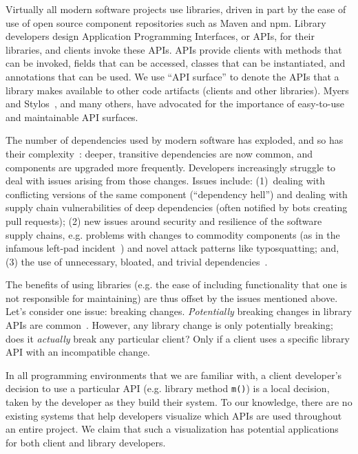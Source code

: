 \label{sec:introduction}

Virtually all modern software projects use libraries, driven in part by the ease of use of open source component repositories such as Maven and npm. Library developers design Application Programming Interfaces, or APIs, for their libraries, and clients invoke these APIs. APIs provide clients with methods that can be invoked, fields that can be accessed, classes that can be instantiated, and annotations that can be used. We use ``API surface'' to denote the APIs that a library makes available to other code artifacts (clients and other libraries). Myers and Stylos~\cite{myers-cacm-2016}, and many others, have advocated for the importance of easy-to-use and maintainable API surfaces.

The number of dependencies used by modern software has exploded, and so has their complexity~\cite{kikas2017structure,benelallam2019maven}: deeper, transitive dependencies are now common, and components are upgraded more frequently. Developers increasingly struggle to deal with issues arising from those changes. Issues include: (1)~dealing with conflicting versions of the same component (``dependency hell'') and dealing with supply chain vulnerabilities of deep dependencies (often notified by bots creating pull requests); (2) new issues around security and resilience of the software supply chains, e.g. problems with changes to commodity components (as in the infamous left-pad incident~\cite{collins16:_how}) and novel attack patterns like typosquatting; and, (3) the use of unnecessary, bloated, and trivial dependencies~\cite{abdalkareem2017developers,soto2021comprehensive}.

The benefits of using libraries (e.g. the ease of including functionality that one is not responsible for maintaining) are thus offset by the issues mentioned above. 
Let's consider one issue: breaking changes. \textit{Potentially} breaking changes in library APIs are common~\cite{dietrich2014broken,raemaekers2014semantic}. However, any library change is only potentially breaking; does it \textit{actually} break any particular client? Only if a client uses a specific library API with an incompatible change.

In all programming environments that we are familiar with, a client developer's decision to use a particular API (e.g. library method {\tt m()}) is a local decision, taken by the developer as they build their system. To our knowledge, there are no existing systems that help developers visualize which APIs are used throughout an entire project. We claim that such a visualization has potential applications for both client and library developers.

